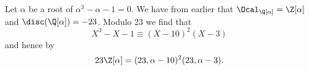 
\begin{exmp*}
	Let \( \alpha \) be a root of \( \alpha^3 - \alpha - 1 = 0 \).
	We have from earlier that \( \Ocal_{\Q[\alpha]} = \Z[\alpha] \) and \( \disc(\Q[\alpha]) = -23 \).
	Modulo 23 we find that
	\[ X^3 - X - 1 \equiv (X-10)^2 (X-3) \]
	and hence by 
	\[ 23 \Z[\alpha] = (23, \alpha-10)^2 (23, \alpha-3). \]
\end{exmp*}